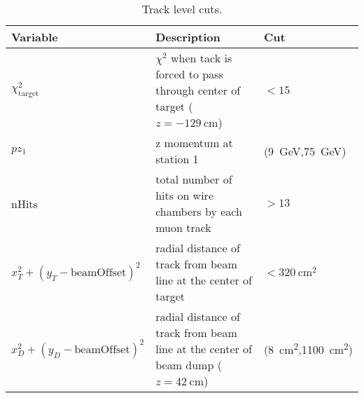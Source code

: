 \documentclass[../main.tex]{subfiles}
\begin{document}
\begin{table}[ht!]
	\centering
	\caption{Track level cuts.}
	\label{table:trackCut}
	\begin{tabular}{|m{4.5cm}|m{7cm}|m{3cm}|}
		\hline
		Variable                                                                                                                                                                                     & Description                                                                          & Cut                          \\ \hline
		$\chi^2_{\mathrm{target}}$                                                                                                                                                                   & $\chi^2$ when tack is   forced to pass through center of target ($z=\SI{-129}{\cm}$) & $< 15$                       \\ \hline
		$pz_1$                                                                                                                                                                                       & z momentum at station 1                                                              & (\SI{9}{\GeV},\SI{75}{\GeV}) \\ \hline
		nHits                                                                                                                                                                                        & total number of hits on wire chambers by each   muon track                           & $> 13$                       \\ \hline
		$x_T^2 +(y_T - \mathrm{beamOffset})^2$                                                                                                                                                       & radial distance of track from   beam line at the center of target                    & $< \SI{320}{\cm\squared}$    \\ \hline
		$x_D^2 +(y_D - \mathrm{beamOffset})^2$                                                                                                                                                       &
		radial distance of track from   beam line at the center of beam dump ($z=\SI{42}{\cm}$)                                                                                                      &
		(\SI{8}{\cm\squared},\SI{1100}{\cm\squared})   \footnotemark[1]                                                                                                                                                                                                                                                    \\ \hline

\end{tabular}
\end{table}
\end{document}
